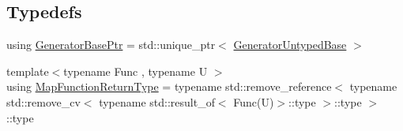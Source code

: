 \subsection*{Typedefs}
\begin{DoxyCompactItemize}
\item 
using \mbox{\hyperlink{namespace_catch_1_1_generators_a1519f304113619d7d18670e2f08276c0}{Generator\+Base\+Ptr}} = std\+::unique\+\_\+ptr$<$ \mbox{\hyperlink{class_catch_1_1_generators_1_1_generator_untyped_base}{Generator\+Untyped\+Base}} $>$
\item 
{\footnotesize template$<$typename Func , typename U $>$ }\\using \mbox{\hyperlink{namespace_catch_1_1_generators_aa509b9b4dd25a6d6309ce8c7da441c02}{Map\+Function\+Return\+Type}} = typename std\+::remove\+\_\+reference$<$ typename std\+::remove\+\_\+cv$<$ typename std\+::result\+\_\+of$<$ Func(U)$>$\+::type $>$\+::type $>$\+::type
\end{DoxyCompactItemize}
